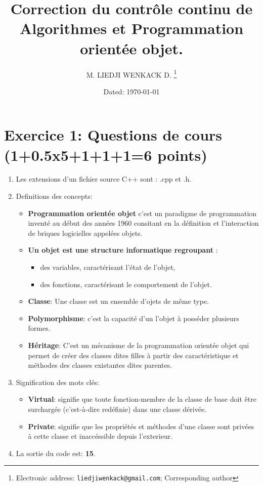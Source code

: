 \documentclass{extarticle}
\title{Correction du contrôle continu de Algorithmes et Programmation orientée objet.}
\author{M. LIEDJI WENKACK D.%
  \thanks{Electronic address: \texttt{liedjiwenkack@gmail.com}; Corresponding author}}
\affil{University of Dschang, Cameroon\\ Universite Internationale Jean Paul 2 De Bafang}
\date{Dated: \today}
\begin{document}
\maketitle

\section*{Exercice 1: \scriptsize{Questions de cours (1+0.5x5+1+1+1=6 points)}}
\begin{enumerate}
      \item Les extensions d'un fichier source C++ sont : .cpp et .h.
      \item Definitions des concepts:
            \begin{itemize}
                  \item \textbf{Programmation orientée objet} c'est un paradigme de programmation inventé au
                        début des années 1960 consitant en la définition et l'interaction de briques logicielles appelées objets.
                  \item \textbf{Un objet est une structure informatique regroupant} :
                        \begin{itemize}
                              \item des variables, caractérisant l’état de l’objet,
                              \item des fonctions, caractérisant le comportement de l’objet.
                        \end{itemize}
                  \item \textbf{Classe}:  Une classe est un ensemble d'ojets de même type.
                  \item \textbf{Polymorphisme}: c'est la capacité d'un l'objet à
                        posséder plusieurs formes.
                  \item \textbf{Héritage}: C'est un mécanisme de la programmation orientée objet qui permet de créer des classes dites filles à partir des caractéristique et méthodes des classes existantes dites parentes.
            \end{itemize}
      \item Signification des mots clés:
            \begin{itemize}
                  \item \textbf{Virtual}: signifie que toute fonction-membre de la classe de base doit être surchargée (c'est-à-dire redéfinie) dans une classe
                        dérivée.
                  \item \textbf{Private}: signifie que les propriétés et méthodes d'une classe sont privées à cette classe et inaccéssible depuis l'exterieur.
            \end{itemize}
      \item La sortie du code est: \textbf{15}.
\end{enumerate}
\end{document}
